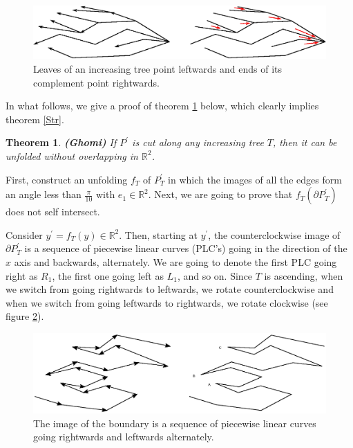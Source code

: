 \documentclass[openright, 12pt]{article}
\newtheorem{teorema}{Theorem}
\newcommand{\field}[1]{\ensuremath{\mathbb{#1}}}
\newcommand{\R}{\field{R}}
\begin{document}
\begin{figure}[h]
\centering
\includegraphics[scale=0.84]{Mono2.eps}
\caption{Leaves of an increasing tree point leftwards and ends of its complement point rightwards.}\label{Mon}
\end{figure}



In what follows, we give a proof of theorem \ref{Gho} below, which clearly implies theorem \ref{Str}. 



\begin{teorema}\label{Gho}
{\rm \textbf{(Ghomi)} If $P^{\prime}$ is cut along any increasing tree $T$, then it can be unfolded without overlapping in $\R ^2$.}
\end{teorema}



First, construct an unfolding $f_T$ of $P^{\prime}_T$ in which the images of all the edges form an angle less than $\frac{\pi}{10}$ with $e_1 \in \R ^2$. Next, we are going to prove that $f_T(\partial P^{\prime}_T)$ does not self intersect.

Consider $y^{\prime} = f_T(y) \in \R ^2$. Then, starting at $y^{\prime}$, the counterclockwise image of $\partial P^{\prime}_T$ is a sequence of piecewise linear curves (PLC's) going in the direction of the $x$ axis and backwards, alternately. We are going to denote the first PLC going right as $R_1$, the first one going left as $L_1$, and so on. Since $T$ is ascending, when we switch from going rightwards to leftwards, we rotate counterclockwise and when we switch from going leftwards to rightwards, we rotate clockwise (see figure \ref{Cro}). 



\begin{figure}[h]
\centering
{}
\includegraphics[scale=0.7]{Bry.eps}
\caption{The image of the boundary is a sequence of piecewise linear curves going rightwards and leftwards alternately.}\label{Cro}
\end{figure}
\end{document}
